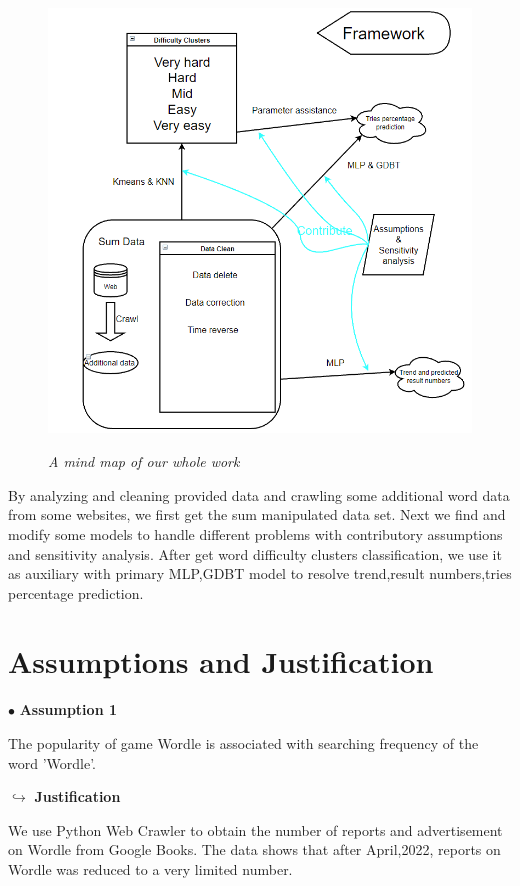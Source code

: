 \documentclass[12pt]{article}
\begin{document}
\begin{figure}[htbp]
	\centering
	\includegraphics[height=12cm, width=12cm]{our_work.png}
	\caption{\textit{A mind map of our whole work}}
	\end{figure}

	By analyzing and cleaning provided data and crawling some additional word data from some websites, we first get the sum manipulated data set. Next we find and modify some models to handle different problems with contributory assumptions and sensitivity analysis. After get word difficulty clusters classification, we use it as auxiliary with primary MLP,GDBT model to resolve trend,result numbers,tries percentage prediction.




\section{Assumptions and Justification}
$\bullet$ \textbf{Assumption 1} 

The popularity of game Wordle is associated with searching frequency of the word 'Wordle'.

$\hookrightarrow$ \textbf{Justification}

We use Python Web Crawler to obtain the number of reports and advertisement on Wordle from  Google Books. The data shows that after April,2022, reports on Wordle was reduced to a very limited number.
\end{document}
